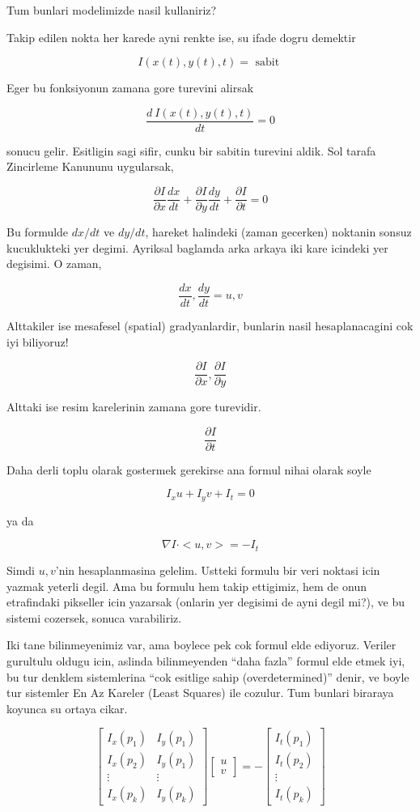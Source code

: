 \documentclass[12pt,fleqn]{article}
\begin{document}
Tum bunlari modelimizde nasil kullaniriz? 

Takip edilen nokta her karede ayni renkte ise, su ifade dogru demektir 

\[ I(x(t),y(t),t) = \textrm{ sabit } \]

Eger bu fonksiyonun zamana gore turevini alirsak

\[ \frac{d \ I(x(t),y(t),t)}{dt} = 0\]

sonucu gelir. Esitligin sagi sifir, cunku bir sabitin turevini aldik. Sol
tarafa Zincirleme Kanununu uygularsak, 

\[ \frac{\partial I}{\partial x}\frac{dx}{dt} +
\frac{\partial I}{\partial y}\frac{dy}{dt} +
\frac{\partial I}{\partial t} = 0
\]

Bu formulde $dx/dt$ ve $dy/dt$, hareket halindeki (zaman gecerken) noktanin
sonsuz kucuklukteki yer degimi. Ayriksal baglamda arka arkaya iki kare
icindeki yer degisimi. O zaman,

\[ \frac{dx}{dt}, \frac{dy}{dt} = u, v \]

Alttakiler ise mesafesel (spatial) gradyanlardir, bunlarin nasil
hesaplanacagini cok iyi biliyoruz! 

\[ 
\frac{\partial I}{\partial x}, \frac{\partial I}{\partial y}
 \]

Alttaki ise resim karelerinin zamana gore turevidir.

\[ 
\frac{\partial I}{\partial t}
 \]

Daha derli toplu olarak gostermek gerekirse ana formul nihai olarak soyle

\[ I_x u + I_y v + I_t = 0 \]

ya da

\[ 
\nabla I \cdot <u, v> = -I_t
 \]

Simdi $u,v$'nin hesaplanmasina gelelim. Ustteki formulu bir veri noktasi
icin yazmak yeterli degil. Ama bu formulu hem takip ettigimiz, hem de onun
etrafindaki pikseller icin yazarsak (onlarin yer degisimi de ayni degil
mi?), ve bu sistemi cozersek, sonuca varabiliriz. 

Iki tane bilinmeyenimiz var, ama boylece pek cok formul elde
ediyoruz. Veriler gurultulu oldugu icin, aslinda bilinmeyenden ``daha
fazla'' formul elde etmek iyi, bu tur denklem sistemlerina ``cok esitlige
sahip (overdetermined)'' denir, ve boyle tur sistemler En Az Kareler (Least
Squares) ile cozulur. Tum bunlari biraraya koyunca su ortaya cikar.

\[ 
\left[\begin{array}{cc}
I_x(p_1) & I_y(p_1) \\
I_x(p_2) & I_y(p_1) \\
\vdots & \vdots \\
I_x(p_k) & I_y(p_k) 
\end{array}\right]
\left[\begin{array}{r}
u \\
v
\end{array}\right] = 
-
\left[\begin{array}{c}
I_t(p_1) \\
I_t(p_2) \\
\vdots \\
I_t(p_k) 
\end{array}\right]
 \]
\end{document}
